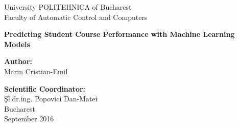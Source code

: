 \thispagestyle{empty}
\begin{center}
\large
University POLITEHNICA of Bucharest \\
Faculty of Automatic Control and Computers \\

{\LARGE
	\textbf{Predicting Student Course Performance with Machine Learning Models}
}

\vspace{3cm}
\textbf{Author:}\\
Marin Cristian-Emil

\bigskip
\bigskip

\textbf{Scientific Coordinator:}\\
Şl.dr.ing. Popovici Dan-Matei\\

Bucharest\\
September 2016 \\
\vspace*{1cm}
\end{center}
